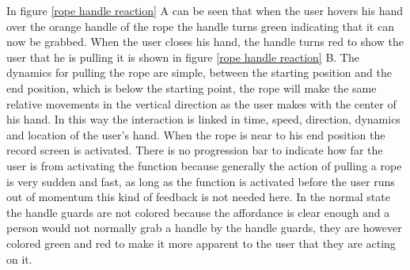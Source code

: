 In figure \ref{rope handle reaction} A can be seen that when the user hovers his hand over the orange handle of the rope the handle turns green indicating that it can now be grabbed. When the user closes his hand, the handle turns red to show the user that he is pulling it is shown in figure \ref{rope handle reaction} B. The dynamics for pulling the rope are simple, between the starting position and the end position, which is below the starting point, the rope will make the same relative movements in the vertical direction as the user makes with the center of his hand. In this way the interaction is linked in time, speed, direction, dynamics and location of the user's hand. When the rope is near to his end position the record screen is activated. There is no progression bar to indicate how far the user is from activating the function because generally the action of pulling a rope is very sudden and fast, as long as the function is activated before the user runs out of momentum this kind of feedback is not needed here. In the normal state the handle guards are not colored because the affordance is clear enough and a person would not normally grab a handle by the handle guards, they are however colored green and red to make it more apparent to the user that they are acting on it.\\

